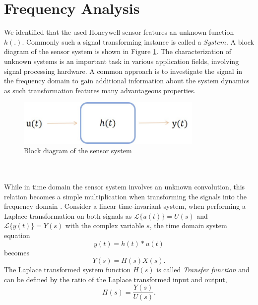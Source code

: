 \documentclass[english]{isasthesis}
\begin{document}
   	\section{Frequency Analysis} \label{frq analysis}
   			We identified that the used Honeywell sensor features an unknown function $h(.)$. Commonly such a signal transforming instance is called a $System$. A block diagram of the sensor system is shown in Figure \ref{fig:block diagram sensor system}. The characterization of unknown systems is an important task in various application fields, involving signal processing hardware. A common approach is to investigate the signal in the frequency domain to gain additional information about the system dynamics as such transformation features many advantageous properties.
   			\begin{figure}[t]
    		\begin{center}
    			\includegraphics[width=0.8\textwidth]{figures/block_diagram_convolution.jpg}   
  			\end{center}
    		\caption{Block diagram of the sensor system}
    		\label{fig:block diagram sensor system}
    		\end{figure}
   			 \\\\While in time domain the sensor system involves an unknown convolution, this relation becomes a simple multiplication when transforming the signals into the frequency domain \cite{roberts2020signals}. Consider a linear time-invariant system, when performing a Laplace transformation on both signals as $\mathcal{L}\{u(t)\} = U(s)$ and $\mathcal{L}\{y(t)\} = Y(s)$ with the complex variable $s$, the time domain system equation
   			\begin{equation}
   			y(t) = h(t)*u(t)
   			\end{equation}
   			becomes
   			\begin{equation}
   			Y(s)=H(s)X(s).
   			\end{equation}
   			The Laplace transformed system function $H(s)$ is called \textit{Transfer function} and can be defined by the ratio of the Laplace transformed input and output,
   			\begin{equation}
   			 H(s) = \frac{Y(s)}{U(s)}.
   			\end{equation}
\end{document}
